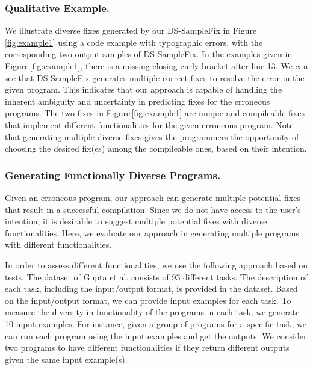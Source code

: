 \documentclass[runningheads]{llncs}
\newcommand{\dssmaplefix}{DS-SampleFix}
\newcommand{\figref}{Figure}
\begin{document}
\subsubsection{Qualitative Example.} 
We illustrate diverse fixes generated by our DS-SampleFix in \figref \,\ref{fig:example1} using a code example with typographic errors, with the corresponding two output samples of \dssmaplefix. In the examples given in \figref \,\ref{fig:example1}, there is a missing closing curly bracket after line 13. We can see that DS-SampleFix generates multiple correct fixes to resolve the error in the given program.
This indicates that our approach is capable of handling the inherent ambiguity and uncertainty in predicting fixes for the erroneous programs. The two fixes in \figref \,\ref{fig:example1} are unique and compileable fixes that implement different functionalities for the given erroneous program. Note that generating multiple diverse fixes gives the programmers the opportunity of choosing the desired fix(es) among the compileable ones, based on their intention.



\subsubsection{Generating Functionally Diverse Programs.}
Given an erroneous program, our approach can generate multiple potential fixes that result in a successful compilation. Since we do not have access to the user's intention, it is desirable to suggest multiple potential fixes with diverse functionalities. Here, we evaluate our approach in generating multiple programs with different functionalities. 

In order to assess different functionalities, we use the following approach based on tests.
The dataset of Gupta et al. \cite{Gupta2017DeepFixFC} consists of 93 different tasks. The description of each task, including the input/output format, is provided in the dataset. Based on the input/output format, we can provide input examples for each task. To measure the diversity in functionality of the programs in each task, we generate 10 input examples. For instance, given a group of programs for a specific task, we can run each program using the input examples and get the outputs. We consider two programs to have different functionalities if they return different outputs given the same input example(s). 
\end{document}
